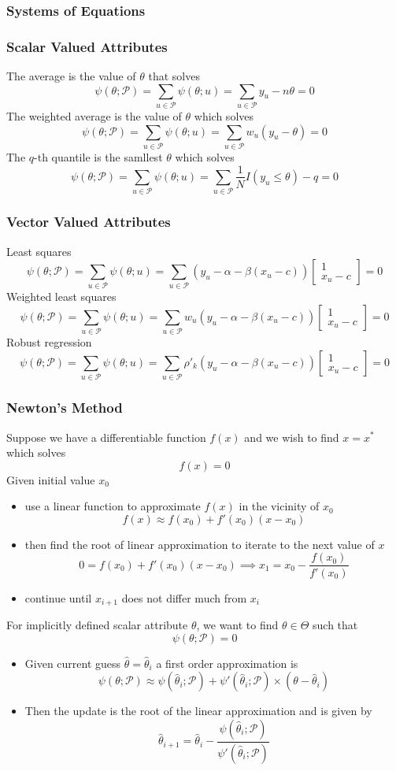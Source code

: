 \documentclass[11pt]{article}
\newcommand{\cv}[1]{\begin{bmatrix} #1 \end{bmatrix}}
\begin{document}
\subsubsection{Systems of Equations}
\subsubsection*{Scalar Valued Attributes}
The average is the value of $\theta$ that solves 
\[\psi(\theta;\mathcal{P}) = \sum_{u\in\mathcal{P}}\psi(\theta;u)=\sum_{u\in\mathcal{P}}y_u-n\theta=0\]   
The weighted average is the value of $\theta$ which solves 
\[\psi(\theta;\mathcal{P}) = \sum_{u\in\mathcal{P}}\psi(\theta;u)=\sum_{u\in\mathcal{P}}w_u(y_u-\theta)=0\]
The $q$-th quantile is the samllest $\theta$ which solves 
\[\psi(\theta;\mathcal{P})=\sum_{u\in\mathcal{P}}\psi(\theta;u)=\sum_{u\in\mathcal{P}}\frac{1}{N}I(y_u\leq\theta)-q=0\]    
\subsubsection*{Vector Valued Attributes}
Least squares
\[\psi(\theta;\mathcal{P}) = \sum_{u\in\mathcal{P}}\psi(\theta;u) = \sum_{u\in\mathcal{P}}(y_u-\alpha-\beta(x_u-c))\cv{1\\x_u-c}=0\]    
Weighted least squares 
\[\psi(\theta;\mathcal{P}) = \sum_{u\in\mathcal{P}}\psi(\theta;u) = \sum_{u\in\mathcal{P}}w_u(y_u-\alpha-\beta(x_u-c))\cv{1\\x_u-c}=0\]
Robust regression
\[\psi(\theta;\mathcal{P}) = \sum_{u\in\mathcal{P}}\psi(\theta;u) = \sum_{u\in\mathcal{P}}\rho'_k(y_u-\alpha-\beta(x_u-c))\cv{1\\x_u-c}=0\]    
\subsubsection{Newton's Method}
Suppose we have a differentiable function $f(x)$ and we wish to find $x=x^*$ which solves \[f(x)=0\]    
Given initial value $x_0$
\begin{itemize}
    \item use a linear function to approximate $f(x)$ in the vicinity of $x_0$ \[f(x)\approx f(x_0)+f'(x_0)(x-x_0)\]    
    \item then find the root of linear approximation to iterate to the next value of $x$ \[0=f(x_0)+f'(x_0)(x-x_0)\implies x_1=x_0-\frac{f(x_0)}{f'(x_0)}\]
    \item continue until $x_{i+1}$ does not differ much from $x_i$ 
\end{itemize}
For implicitly defined scalar attribute $\theta$, we want to find $\theta\in\Theta$ such that 
\[\psi(\theta;\mathcal{P})=0\]    
\begin{itemize}
    \item Given current guess $\hat{\theta} = \hat{\theta}_i$ a first order approximation is \[\psi(\theta;\mathcal{P})\approx \psi(\hat{\theta}_i;\mathcal{P})+\psi'(\hat{\theta}_i;\mathcal{P})\times(\theta-\hat{\theta}_i)\]    
    \item Then the update is the root of the linear approximation and is given by \[\hat{\theta}_{i+1}=\hat{\theta}_i-\frac{\psi(\hat{\theta}_i;\mathcal{P})}{\psi'(\hat{\theta}_i;\mathcal{P})}\]
\end{itemize}
\end{document}
